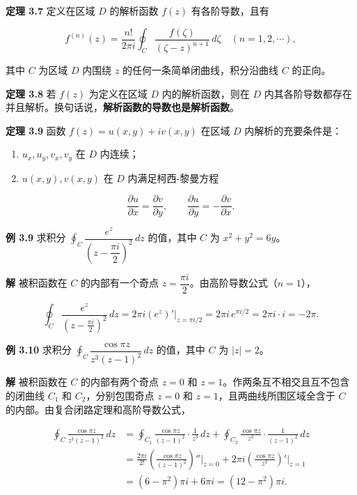 \textbf{定理 3.7} 定义在区域 \(D\) 的解析函数 \(f(z)\) 有各阶导数，且有

\[
f^{(n)}(z)=\frac{n!}{2\pi i}\oint_C\frac{f(\zeta)}{(\zeta-z)^{n+1}}\,d\zeta\quad(n=1,2,\cdots),
\]

其中 \(C\) 为区域 \(D\) 内围绕 \(z\) 的任何一条简单闭曲线，积分沿曲线
\(C\) 的正向。

\textbf{定理 3.8} 若 \(f(z)\) 为定义在区域 \(D\) 内的解析函数，则在
\(D\)
内其各阶导数都存在并且解析。换句话说，\textbf{解析函数的导数也是解析函数}。

\textbf{定理 3.9} 函数 \(f(z)=u(x,y)+iv(x,y)\) 在区域 \(D\)
内解析的充要条件是：

\begin{enumerate}
\def\labelenumi{\arabic{enumi}.}
\tightlist
\item
  \(u_x,u_y,v_x,v_y\) 在 \(D\) 内连续；
\item
  \(u(x,y),v(x,y)\) 在 \(D\) 内满足柯西-黎曼方程
\end{enumerate}

\[
\frac{\partial u}{\partial x}=\frac{\partial v}{\partial y},\qquad \frac{\partial u}{\partial y}=-\frac{\partial v}{\partial x}.
\]

\textbf{例 3.9} 求积分
\(\oint_C\dfrac{e^z}{\left(z-\dfrac{\pi i}{2}\right)^2}\,dz\) 的值，其中
\(C\) 为 \(x^2+y^2=6y\)。

\textbf{解} 被积函数在 \(C\) 的内部有一个奇点
\(z=\dfrac{\pi i}{2}\)。由高阶导数公式（\(n=1\)），

\[
\oint_C\frac{e^z}{\left(z-\frac{\pi i}{2}\right)^2}\,dz
=2\pi i\left(e^z\right)'\Big|_{z=\pi i/2}
=2\pi i\,e^{\pi i/2}=2\pi i\cdot i=-2\pi .
\]

\textbf{例 3.10} 求积分 \(\oint_C\dfrac{\cos\pi z}{z^3(z-1)^2}\,dz\)
的值，其中 \(C\) 为 \(|z|=2\)。

\textbf{解} 被积函数在 \(C\) 的内部有两个奇点 \(z=0\) 和
\(z=1\)。作两条互不相交且互不包含的闭曲线 \(C_1\) 和
\(C_2\)，分别包围奇点 \(z=0\) 和 \(z=1\)，且两曲线所围区域全含于 \(C\)
的内部。由复合闭路定理和高阶导数公式，

\[
\begin{aligned}
\oint_C\frac{\cos\pi z}{z^3(z-1)^2}\,dz
&=\oint_{C_1}\frac{\cos\pi z}{(z-1)^2}\cdot\frac{1}{z^3}\,dz
+\oint_{C_2}\frac{\cos\pi z}{z^3}\cdot\frac{1}{(z-1)^2}\,dz\\
&=\frac{2\pi i}{2!}\left(\frac{\cos\pi z}{(z-1)^2}\right)''\Big|_{z=0}
+2\pi i\left(\frac{\cos\pi z}{z^3}\right)'\Big|_{z=1}\\
&=(6-\pi^2)\pi i+6\pi i=(12-\pi^2)\pi i .
\end{aligned}
\]

